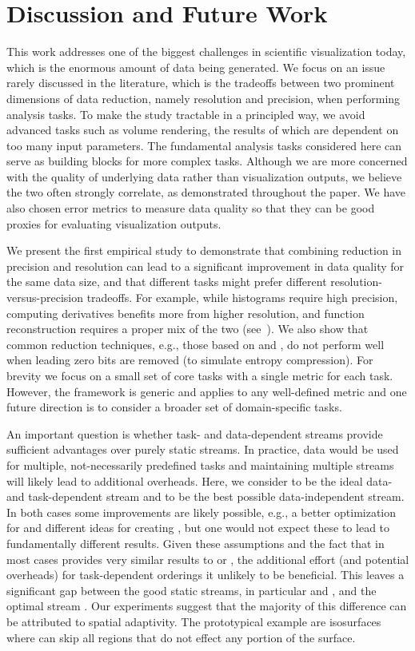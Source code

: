 \section{Discussion and Future Work}

This work addresses one of the biggest challenges in scientific visualization today, which is the
enormous amount of data being generated. We focus on an issue rarely discussed in the literature,
which is the tradeoffs between two prominent dimensions of data reduction, namely resolution and
precision, when performing analysis tasks. To make the study tractable in a principled way, we avoid
advanced tasks such as volume rendering, the results of which are dependent on too many input
parameters. The fundamental analysis tasks considered here can serve as building blocks for more
complex tasks. Although we are more concerned with the quality of underlying data rather than
visualization outputs, we believe the two often strongly correlate, as demonstrated throughout the
paper. We have also chosen error metrics to measure data quality so that they can be good proxies
for evaluating visualization outputs.

We present the first empirical study to demonstrate that combining reduction in precision and
resolution can lead to a significant improvement in data quality for the same data size, and that
different tasks might prefer different resolution-versus-precision tradeoffs. For example, while
histograms require high precision, computing derivatives benefits more from higher resolution, and
function reconstruction requires a proper mix of the two (see~). We also show
that common reduction techniques, e.g., those based on \slvl and \smag, do not perform well when
leading zero bits are removed (to simulate entropy compression). For brevity we focus on a small set
of core tasks with a single metric for each task. However, the framework is generic and applies to
any well-defined metric and one future direction is to consider a broader set of domain-specific
tasks. 

An important question is whether task- and data-dependent streams provide sufficient advantages over
purely static streams. In practice, data would be used for multiple, not-necessarily predefined tasks
and maintaining multiple streams will likely lead to additional overheads. Here, we consider \sopt
to be the ideal data- and task-dependent stream and \ssig to be the best possible data-independent
stream. In both cases some improvements are likely possible, e.g., a better optimization for \sopt
and different ideas for creating \ssig, but one would not expect these to lead to fundamentally
different results. Given these assumptions and the fact that \ssig in most cases provides very
similar results to \sbit or \swav, the additional effort (and potential overheads) for
task-dependent orderings it unlikely to be beneficial. This leaves a significant gap between the
good static streams, in particular \swav and \sbit, and the optimal stream \sopt. Our experiments
suggest that the majority of this difference can be attributed to spatial adaptivity. The
prototypical example are isosurfaces where \sopt can skip all regions that do not effect any
portion of the surface.

